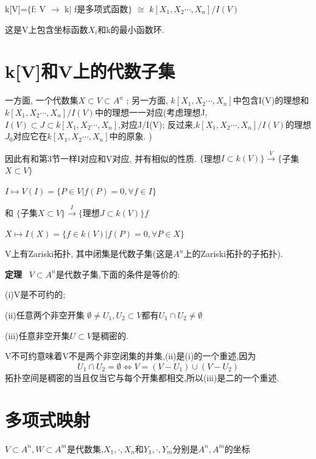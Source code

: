 \documentclass[UTF8]{book}
\begin{document}
				\center  k[V]=$\{$f: V  $\rightarrow$  k$\vert$ f是多项式函数$\}$ $\cong $ $k[X_{1},X_{2}\cdots,X_{n}]/I(V)$


		\justifying
		这是V上包含坐标函数$X_{i}$和k的最小函数环.


	\section{k[V]和V上的代数子集} 一方面, 一个代数集$X\subset V\subset A^{n}$ ; 另一方面, $k[X_{1},X_{2}\cdots,X_{n}]$中包含I(V)的理想和$ k[X_{1},X_{2}\cdots,X_{n}]/I(V)$中的理想一一对应(考虑理想J,$I(V) \subset J \subset k[X_{1},X_{2}\cdots,X_{n}]$,对应J/I(V); 反过来,$k[X_{1},X_{2}\cdots,X_{n}]/I(V)$的理想$J_{0}$对应它在$k[X_{1},X_{2}\cdots,X_{n}]$中的原象. )

		因此有和第3节一样I对应和V对应, 并有相似的性质.
			   \center  $\{$理想$I\subset k(V)\}\stackrel{V}{\longrightarrow} \{$子集$X\subset V \}$



			  $ I \longmapsto V(I)=\{P\in V\vert f(P)=0,\forall f \in I \}$

		\justifying
		和
			\center  $\{$子集$X\subset V \}\stackrel{I}{\longrightarrow} \{$理想$J\subset k(V)\}f$


			   $ X \longmapsto I(X)=\{f\in k(V)\vert f(P)=0,\forall P \in X\}$

		\justifying
		V上有Zariski拓扑, 其中闭集是代数子集(这是$A^{n}$上的Zariski拓扑的子拓扑).

		\textbf{定理} \ $V\subset A^{n}$是代数子集,下面的条件是等价的:

		(i)V是不可约的;

		(ii)任意两个非空开集 $\emptyset \neq U_{1},U_{2} \subset V $都有$U_{1} \cap U_{2}\neq \emptyset$

		(iii)任意非空开集$U\subset V$是稠密的.

		V不可约意味着V不是两个非空闭集的并集,(ii)是(i)的一个重述,因为
		\begin{equation*}
		U_{1}\cap U_{2}=\emptyset \Longleftrightarrow V=(V-U_{1})\cup (V-U_{2})
		\end{equation*}
		拓扑空间是稠密的当且仅当它与每个开集都相交,所以(iii)是二的一个重述.

	\section{多项式映射} $V\subset A^{n},W\subset A^{m}$是代数集,$X_{1},\cdot,X_{n}$和$Y_{1},\cdot,Y_{m}$分别是$A^{n},A^{m}$的坐标
\end{document}
